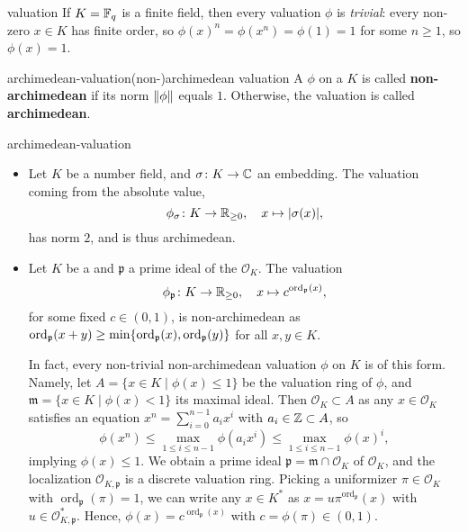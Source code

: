 \begin{example}{valuation}
    If $K = \mathbb{F}_q$ is a finite field, then every valuation $\phi$ is \textit{trivial}: every non-zero $x \in K$ has finite order, so $\phi(x)^n = \phi(x^n) = \phi(1) = 1$ for some $n \ge 1$, so $\phi(x) = 1$.
\end{example}

\begin{topic}{archimedean-valuation}{(non-)archimedean valuation}
    A  $\phi$ on a  $K$ is called \textbf{non-archimedean} if its norm $\left\|\phi\right\|$ equals $1$. Otherwise, the valuation is called \textbf{archimedean}.
\end{topic}

\begin{example}{archimedean-valuation}
    \begin{itemize}
        \item Let $K$ be a number field, and $\sigma \colon K \to \mathbb{C}$ an embedding. The valuation coming from the absolute value,
        \[ \phi_\sigma \colon K \to \mathbb{R}_{\ge 0}, \quad x \mapsto |\sigma(x)| , \]
        has norm $2$, and is thus archimedean.
        \item Let $K$ be a  and $\mathfrak{p}$ a prime ideal of the  $\mathcal{O}_K$. The valuation
        \[ \phi_\mathfrak{p} \colon K \to \mathbb{R}_{\ge 0}, \quad x \mapsto c^{\textup{ord}_\mathfrak{p}(x)} , \]
        for some fixed $c \in (0, 1)$, is non-archimedean as $\textup{ord}_\mathfrak{p}(x + y) \ge \min \{ \textup{ord}_\mathfrak{p}(x), \textup{ord}_\mathfrak{p}(y) \}$ for all $x, y \in K$.
        
        In fact, every non-trivial non-archimedean valuation $\phi$ on $K$ is of this form. Namely, let $A = \{ x \in K \mid \phi(x) \le 1 \}$ be the valuation ring of $\phi$, and $\mathfrak{m} = \{ x \in K \mid \phi(x) < 1 \}$ its maximal ideal. Then $\mathcal{O}_K \subset A$ as any $x \in \mathcal{O}_K$ satisfies an equation $x^n = \sum_{i = 0}^{n - 1} a_i x^i$ with $a_i \in \mathbb{Z} \subset A$, so
        \[ \phi(x^n) \le \max_{1 \le i \le n - 1} \phi(a_i x^i) \le \max_{1 \le i \le n - 1} \phi(x)^i , \]
        implying $\phi(x) \le 1$. We obtain a prime ideal $\mathfrak{p} = \mathfrak{m} \cap \mathcal{O}_K$ of $\mathcal{O}_K$, and the localization $\mathcal{O}_{K, \mathfrak{p}}$ is a discrete valuation ring. Picking a uniformizer $\pi \in \mathcal{O}_K$ with $\operatorname{ord}_\mathfrak{p}(\pi) = 1$, we can write any $x \in K^*$ as $x = u \pi^{\operatorname{ord}_\mathfrak{p}}(x)$ with $u \in \mathcal{O}_{K, \mathfrak{p}}^*$. Hence, $\phi(x) = c^{\operatorname{ord}_\mathfrak{p}(x)}$ with $c = \phi(\pi) \in (0, 1)$.
    \end{itemize}
\end{example}

